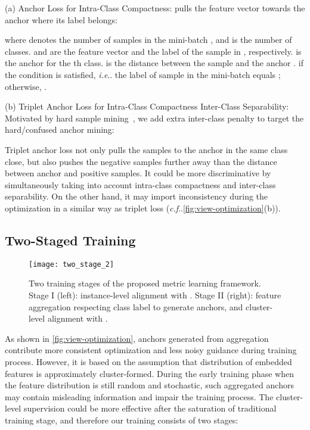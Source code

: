 \documentclass[runningheads]{llncs}
\makeatletter
\DeclareRobustCommand\onedot{\futurelet\@let@token\@onedot}
\def\@onedot{\ifx\@let@token.\else.\null\fi\xspace}
\def\ie{\emph{i.e}\onedot} \def\Ie{\emph{I.e}\onedot}
\def\cf{\emph{c.f}\onedot} \def\Cf{\emph{C.f}\onedot}
\makeatother
\begin{document}
(a)  Anchor Loss for Intra-Class Compactness:  pulls the feature vector towards the anchor where its label belongs:
\vspace*{-0.28cm}

where  denotes the number of samples in the mini-batch , and  is the number of classes.   and  are the feature vector and the label of the sample  in , respectively.
  is the anchor for the th class. 
  is the distance between the sample  and the anchor .
 if the condition is satisfied, \ie the label of sample  in the mini-batch equals ; otherwise, .
 
(b) Triplet Anchor Loss for Intra-Class Compactness  Inter-Class Separability: Motivated by hard sample mining~\cite{hermans-triplethard}, we add extra inter-class penalty to target the hard/confused anchor mining:
\vspace*{-0.28cm}

Triplet anchor loss not only pulls the samples to the anchor in the same class close, but also pushes the negative samples further away than the distance between anchor and positive samples. It could be more discriminative by simultaneously taking into account intra-class compactness and inter-class separability. On the other hand, it may import inconsistency during the optimization in a similar way as triplet loss (\cf \cref{fig:view-optimization}(b)). 



\subsection{Two-Staged Training}

\begin{figure}
    \vspace*{-0.38cm}
    \centering
\texttt{[image: two\_stage\_2]}
    \vspace*{-0.58cm}
    \caption{Two training stages of the proposed metric learning framework. Stage I (left): instance-level alignment with . Stage II (right): feature aggregation respecting class label to generate anchors, and cluster-level alignment with .}
    \label{fig:overview}
    \vspace*{-0.58cm}
\end{figure}

As shown in \cref{fig:view-optimization}, anchors generated from aggregation contribute more consistent optimization and less noisy guidance during training process.
However, it is based on the assumption that distribution of embedded features is approximately cluster-formed.
During the early training phase when the feature distribution is still random and stochastic, such aggregated anchors may contain misleading information and impair the training process.
The cluster-level supervision could be more effective after the saturation of traditional training stage, and therefore our training consists of two stages: 
\end{document}
